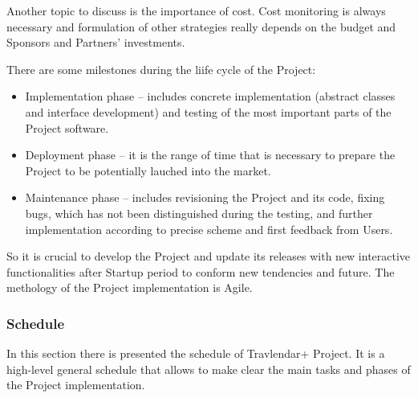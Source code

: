 \documentclass[a4paper,leqno]{article}
\begin{document}
Another topic to discuss is the importance of cost. Cost monitoring is always necessary and formulation of other strategies really depends on the budget and Sponsors and Partners' investments.

There are some milestones during the liife cycle of the Project:
\begin{itemize}
	\item Implementation phase -- includes concrete implementation (abstract classes and interface development) and testing of the most important parts of the Project software.
	\item Deployment phase -- it is the range of time that is necessary to prepare the Project to be potentially lauched into the market.
	\item Maintenance phase -- includes revisioning the Project and its code, fixing bugs, which has not been distinguished during the testing, and further implementation according to precise scheme and first feedback from Users.
\end{itemize}

So it is crucial to develop the Project and update its releases with new interactive functionalities after Startup period to conform new tendencies and future. The methology of the Project implementation is Agile.

\subsubsection{Schedule}
In this section there is presented the schedule of Travlendar+ Project. It is a high-level general schedule that allows to make clear the main tasks and phases of the Project implementation.
\end{document}
